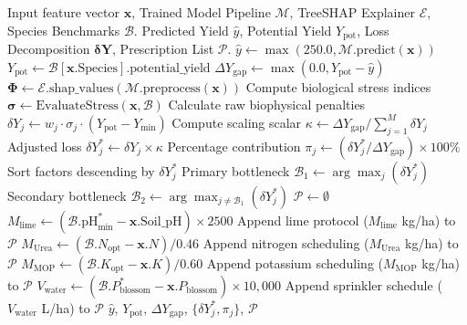\documentclass[conference]{IEEEtran}
\begin{document}
\begin{algorithm}[!t]
\caption{Root-Cause Yield Loss Diagnosis and Prescription}
\label{alg:diagnosis}
\begin{algorithmic}[1]
\REQUIRE Input feature vector $\mathbf{x}$, Trained Model Pipeline $\mathcal{M}$, TreeSHAP Explainer $\mathcal{E}$, Species Benchmarks $\mathcal{B}$.
\ENSURE Predicted Yield $\hat{y}$, Potential Yield $Y_{\text{pot}}$, Loss Decomposition $\mathbf{\delta Y}$, Prescription List $\mathcal{P}$.
\STATE $\hat{y} \leftarrow \max(250.0, \mathcal{M}.\text{predict}(\mathbf{x}))$
\STATE $Y_{\text{pot}} \leftarrow \mathcal{B}[\mathbf{x}.\text{Species}].\text{potential\_yield}$
\STATE $\Delta Y_{\text{gap}} \leftarrow \max(0.0, Y_{\text{pot}} - \hat{y})$
\STATE $\mathbf{\Phi} \leftarrow \mathcal{E}.\text{shap\_values}(\mathcal{M}.\text{preprocess}(\mathbf{x}))$
\STATE Compute biological stress indices $\mathbf{\sigma} \leftarrow \text{EvaluateStress}(\mathbf{x}, \mathcal{B})$
\STATE Calculate raw biophysical penalties $\delta Y_j \leftarrow w_j \cdot \sigma_j \cdot (Y_{\text{pot}} - Y_{\text{min}})$
\STATE Compute scaling scalar $\kappa \leftarrow \Delta Y_{\text{gap}} / \sum_{j=1}^M \delta Y_j$
    \STATE Adjusted loss $\delta Y_j^* \leftarrow \delta Y_j \times \kappa$
    \STATE Percentage contribution $\pi_j \leftarrow (\delta Y_j^* / \Delta Y_{\text{gap}}) \times 100\%$
\ENDFOR
\STATE Sort factors descending by $\delta Y_j^*$
\STATE Primary bottleneck $\mathcal{B}_1 \leftarrow \arg\max_j (\delta Y_j^*)$
\STATE Secondary bottleneck $\mathcal{B}_2 \leftarrow \arg\max_{j \neq \mathcal{B}_1} (\delta Y_j^*)$
\STATE $\mathcal{P} \leftarrow \emptyset$
    \STATE $M_{\text{lime}} \leftarrow (\mathcal{B}.\text{pH}_{\text{min}}^* - \mathbf{x}.\text{Soil\_pH}) \times 2500$
    \STATE Append lime protocol ($M_{\text{lime}}$ kg/ha) to $\mathcal{P}$
\ENDIF
{}
    \STATE $M_{\text{Urea}} \leftarrow (\mathcal{B}.N_{\text{opt}} - \mathbf{x}.N) / 0.46$
    \STATE Append nitrogen scheduling ($M_{\text{Urea}}$ kg/ha) to $\mathcal{P}$
\ENDIF
{}
    \STATE $M_{\text{MOP}} \leftarrow (\mathcal{B}.K_{\text{opt}} - \mathbf{x}.K) / 0.60$
    \STATE Append potassium scheduling ($M_{\text{MOP}}$ kg/ha) to $\mathcal{P}$
\ENDIF
{}
    \STATE $V_{\text{water}} \leftarrow (\mathcal{B}.P_{\text{blossom}}^* - \mathbf{x}.P_{\text{blossom}}) \times 10,000$
    \STATE Append sprinkler schedule ($V_{\text{water}}$ L/ha) to $\mathcal{P}$
\ENDIF
\RETURN $\hat{y}$, $Y_{\text{pot}}$, $\Delta Y_{\text{gap}}$, $\{\delta Y_j^*, \pi_j\}$, $\mathcal{P}$
\end{algorithmic}
\end{algorithm}
\end{document}
